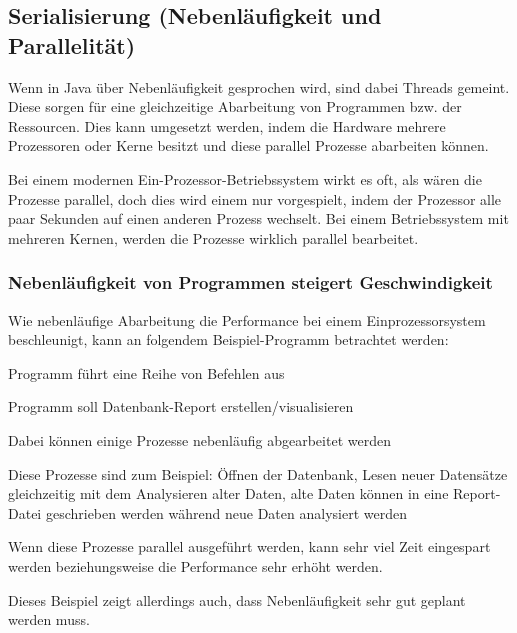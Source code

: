  
 
 
\subsection{Serialisierung (Nebenläufigkeit und Parallelität)}
Wenn in Java über Nebenläufigkeit gesprochen wird, sind dabei Threads gemeint. Diese sorgen für eine gleichzeitige Abarbeitung von Programmen bzw. der Ressourcen. Dies kann umgesetzt werden, indem die Hardware mehrere Prozessoren oder Kerne besitzt und diese parallel Prozesse abarbeiten können.
 
Bei einem modernen Ein-Prozessor-Betriebssystem wirkt es oft, als wären die Prozesse parallel, doch dies wird einem nur vorgespielt, indem der Prozessor alle paar Sekunden auf einen anderen Prozess wechselt. Bei einem Betriebssystem mit mehreren Kernen, werden die Prozesse wirklich parallel bearbeitet.
 
\subsubsection{Nebenläufigkeit von Programmen steigert Geschwindigkeit}
Wie nebenläufige Abarbeitung die Performance bei einem Einprozessorsystem beschleunigt, kann an folgendem Beispiel-Programm betrachtet werden:
 
\begin{compactitem}
    \item Programm führt eine Reihe von Befehlen aus
    \item Programm soll Datenbank-Report erstellen/visualisieren    
    \item Dabei können einige Prozesse nebenläufig abgearbeitet werden
    \item Diese Prozesse sind zum Beispiel: Öffnen der Datenbank, Lesen neuer Datensätze gleichzeitig mit dem Analysieren alter Daten, alte Daten können in eine Report-Datei geschrieben werden während neue Daten analysiert werden
    \item Wenn diese Prozesse parallel ausgeführt werden, kann sehr viel Zeit eingespart werden beziehungsweise die Performance sehr erhöht werden.
    \item Dieses Beispiel zeigt allerdings auch, dass Nebenläufigkeit sehr gut geplant werden muss.
\end{compactitem}
 
